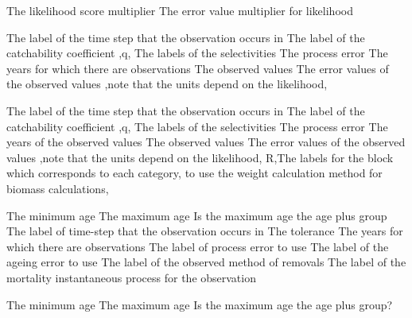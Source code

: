  {The likelihood score multiplier}
 {The error value multiplier for likelihood}
\par\textbf{}\par
{} {The label of the time step that the observation occurs in}
 {The label of the catchability coefficient ,q,}
 {The labels of the selectivities}
 {The process error}
 {The years for which there are observations}
 {The observed values}
 {The error values of the observed values ,note that the units depend on the likelihood,}
\par\textbf{}\par
{} {The label of the time step that the observation occurs in}
 {The label of the catchability coefficient ,q,}
 {The labels of the selectivities}
 {The process error}
 {The years of the observed values}
 {The observed values}
 {The error values of the observed values ,note that the units depend on the likelihood,}
 {R,The labels for the  block which corresponds to each category, to use the weight calculation method for biomass calculations,}
\par\textbf{}\par
{} {The minimum age}
 {The maximum age}
 {Is the maximum age the age plus group}
 {The label of time-step that the observation occurs in}
 {The tolerance}
 {The years for which there are observations}
 {The label of process error to use}
 {The label of the ageing error to use}
 {The label of the observed method of removals}
 {The label of the mortality instantaneous process for the observation}
\par\textbf{}\par
{} {The minimum age}
 {The maximum age}
 {Is the maximum age the age plus group?}
